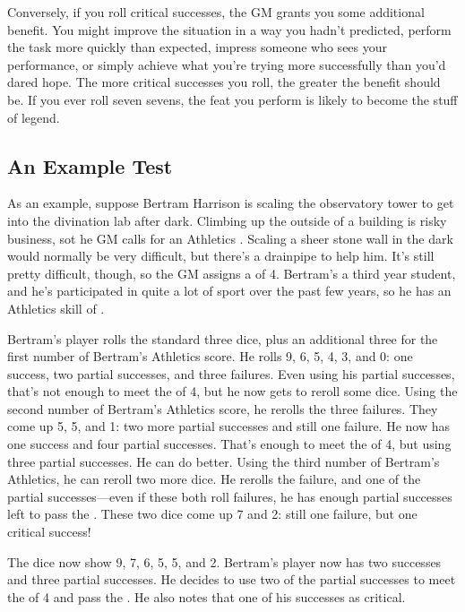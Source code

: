 Conversely, if you roll critical successes, the GM grants you some additional benefit.
You might improve the situation in a way you hadn't predicted, perform the task more quickly than expected, impress someone who sees your performance, or simply achieve what you're trying more successfully than you'd dared hope.
The more critical successes you roll, the greater the benefit should be.
If you ever roll seven sevens, the feat you perform is likely to become the stuff of legend.

\subsection{An Example Test}


As an example, suppose Bertram Harrison is scaling the observatory tower to get into the divination lab after dark.
Climbing up the outside of a building is risky business, sot he GM calls for an Athletics {\test}.
Scaling a sheer stone wall in the dark would normally be very difficult, but there's a drainpipe to help him.
It's still pretty difficult, though, so the GM assigns a {\tn} of 4.
Bertram's a third year student, and he's participated in quite a lot of sport over the past few years, so he has an Athletics skill of .

Bertram's player rolls the standard three dice, plus an additional three for the first number of Bertram's Athletics score.
He rolls 9, 6, 5, 4, 3, and 0: one success, two partial successes, and three failures.
Even using his partial successes, that's not enough to meet the {\tn} of 4, but he now gets to reroll some dice.
Using the second number of Bertram's Athletics score, he rerolls the three failures.
They come up 5, 5, and 1: two more partial successes and still one failure.
He now has one success and four partial successes.
That's enough to meet the {\tn} of 4, but using three partial successes.
He can do better.
Using the third number of Bertram's Athletics, he can reroll two more dice.
He rerolls the failure, and one of the partial successes---even if these both roll failures, he has enough partial successes left to pass the {\test}.
These two dice come up 7 and 2: still one failure, but one critical success!

The dice now show 9, 7, 6, 5, 5, and 2.
Bertram's player now has two successes and three partial successes.
He decides to use two of the partial successes to meet the {\tn} of 4 and pass the {\test}.
He also notes that one of his successes as critical.

